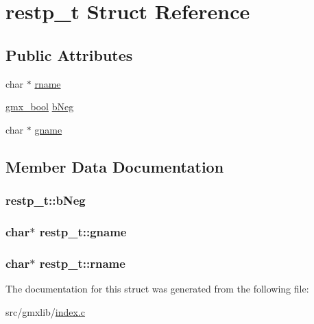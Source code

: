 \hypertarget{structrestp__t}{\section{restp\-\_\-t \-Struct \-Reference}
\label{structrestp__t}
}
\subsection*{\-Public \-Attributes}
\begin{DoxyCompactItemize}
\item 
char $\ast$ \hyperlink{structrestp__t_a03a0d9dc245de8c3dce1bdc3cf59ba68}{rname}
\item 
\hyperlink{include_2types_2simple_8h_a8fddad319f226e856400d190198d5151}{gmx\-\_\-bool} \hyperlink{structrestp__t_a492a9f3f7a3befff683d3763b9ddab88}{b\-Neg}
\item 
char $\ast$ \hyperlink{structrestp__t_a95cffc37d99b7a296f97d1658013b7f7}{gname}
\end{DoxyCompactItemize}


\subsection{\-Member \-Data \-Documentation}
\hypertarget{structrestp__t_a492a9f3f7a3befff683d3763b9ddab88}{
\subsubsection[{b\-Neg}]{ {\bf restp\-\_\-t\-::b\-Neg}}}\label{structrestp__t_a492a9f3f7a3befff683d3763b9ddab88}
\hypertarget{structrestp__t_a95cffc37d99b7a296f97d1658013b7f7}{
\subsubsection[{gname}]{\setlength{\rightskip}{0pt plus 5cm}char$\ast$ {\bf restp\-\_\-t\-::gname}}}\label{structrestp__t_a95cffc37d99b7a296f97d1658013b7f7}
\hypertarget{structrestp__t_a03a0d9dc245de8c3dce1bdc3cf59ba68}{
\subsubsection[{rname}]{\setlength{\rightskip}{0pt plus 5cm}char$\ast$ {\bf restp\-\_\-t\-::rname}}}\label{structrestp__t_a03a0d9dc245de8c3dce1bdc3cf59ba68}


\-The documentation for this struct was generated from the following file\-:\begin{DoxyCompactItemize}
\item 
src/gmxlib/\hyperlink{index_8c}{index.\-c}\end{DoxyCompactItemize}
